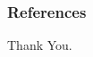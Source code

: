 \documentclass{beamer}
\begin{document}
\begin{frame}
        \frametitle{References}
        \printbibliography
\end{frame}

\begin{frame}{}
\begin{center}
    \Huge Thank You.
\end{center}
\end{frame}

\end{document}
